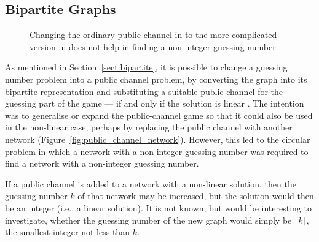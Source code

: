\subsection{Bipartite Graphs}

\begin{figure}[ht]
     \centering
     \hspace{.3in}

		 \caption[Public-channel problems with different types of channel]{Changing the ordinary public channel in  to the more complicated version in  does not help in finding a non-integer guessing number.}
\end{figure}

As mentioned in Section~\ref{sect:bipartite}, it is possible to change a guessing number problem into a public channel problem, by converting the graph into its bipartite representation and substituting a suitable public channel for the guessing part of the game --- if and only if the solution is linear \cite{riis2005util}. The intention was to generalise or expand the public-channel game so that it could also be used in the non-linear case, perhaps by replacing the public channel with another network (Figure~\ref{fig:public_channel_network}). However, this led to the circular problem in which a network with a non-integer guessing number was required to find a network with a non-integer guessing number.

If a public channel is added to a network with a non-linear solution, then the guessing number $k$ of that network may be increased, but the solution would then be an integer (i.e., a linear solution). It is not known, but would be interesting to investigate, whether the guessing number of the new graph would simply be $\lceil k \rceil$, the smallest integer not less than $k$.

